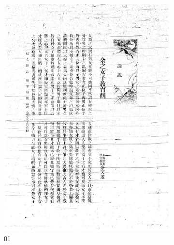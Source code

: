 \documentclass[12pt,twoside]{report}
\begin{document}
\begin{appendices}
\begin{figure}[htbp]
    \centering
    \begin{subfigure}[b]{0.23\linewidth}
        \includegraphics[width=\linewidth]{./figures/testset/01.jpg}
        \caption{01}
        \label{fig:test_01}
    \end{subfigure}
    \hfill
    \begin{subfigure}[b]{0.23\linewidth}

\end{subfigure}
\end{figure}
\end{appendices}
\end{document}

